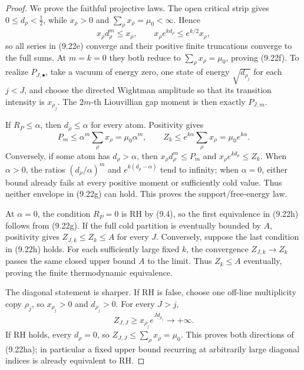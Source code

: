 \documentclass[11pt]{article}
\begin{document}
\begin{proof}
We prove the faithful projective laws.  The open critical strip gives
$0\le d_\rho<\frac12$, while $x_\rho>0$ and
$\sum_\rho x_\rho=\mu_0<\infty$.  Hence
\[
 x_\rho d_\rho^m\le x_\rho,
 \qquad
 x_\rho e^{k d_\rho}\le e^{k/2}x_\rho,
\]
so all series in \textup{(9.22e)} converge and their positive finite truncations converge to
the full sums.  At $m=k=0$ they both reduce to $\sum_\rho x_\rho=\mu_0$, proving
\textup{(9.22f)}.  To realize $P_{J,\bullet}$, take a vacuum of energy zero, one state of
energy $\sqrt{d_{\rho_j}}$ for each $j<J$, and choose the directed Wightman amplitude so that
its transition intensity is $x_{\rho_j}$.  The $2m$-th Liouvillian gap moment is then exactly
$P_{J,m}$.

If $R_P\le\alpha$, then $d_\rho\le\alpha$ for every atom.  Positivity gives
\[
 P_m\le\alpha^m\sum_\rho x_\rho=\mu_0\alpha^m,
 \qquad
 Z_k\le e^{k\alpha}\sum_\rho x_\rho=\mu_0e^{k\alpha}.
 \tag{9.22i}
\]
Conversely, if some atom has $d_\rho>\alpha$, then
$x_\rho d_\rho^m\le P_m$ and $x_\rho e^{kd_\rho}\le Z_k$.  When $\alpha>0$, the ratios
$(d_\rho/\alpha)^m$ and $e^{k(d_\rho-\alpha)}$ tend to infinity; when $\alpha=0$, either
bound already fails at every positive moment or sufficiently cold value.  Thus neither envelope
in \textup{(9.22g)} can hold.  This proves the support/free-energy law.

At $\alpha=0$, the condition $R_P=0$ is RH by \textup{(9.4)}, so the first equivalence in
\textup{(9.22h)} follows from \textup{(9.22g)}.  If the full cold partition is eventually
bounded by $A$, positivity gives $Z_{J,k}\le Z_k\le A$ for every $J$.  Conversely, suppose the
last condition in \textup{(9.22h)} holds.  For each sufficiently large fixed $k$, the convergence
$Z_{J,k}\to Z_k$ passes the same closed upper bound $A$ to the limit.  Thus $Z_k\le A$
eventually, proving the finite thermodynamic equivalence.

The diagonal statement is sharper.  If RH is false, choose one off-line multiplicity copy
\(\rho_j\), so \(x_{\rho_j}>0\) and \(d_{\rho_j}>0\).  For every \(J>j\),
\[
 Z_{J,J}\ge x_{\rho_j}e^{Jd_{\rho_j}}\longrightarrow+\infty.
\]
If RH holds, every \(d_\rho=0\), so \(Z_{J,J}\le\sum_\rho x_\rho=\mu_0\).  This proves both
directions of \textup{(9.22ha)}; in particular a fixed upper bound recurring at arbitrarily
large diagonal indices is already equivalent to RH.


\end{proof}
\end{document}
